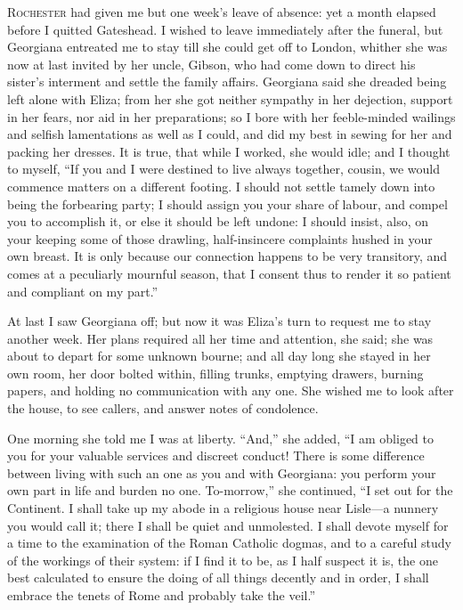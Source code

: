
 \textsc{ Rochester} had given me but one week's leave of absence: yet a month
elapsed before I quitted Gateshead. I wished to leave immediately after
the funeral, but Georgiana entreated me to stay till she could get off
to London, whither she was now at last invited by her uncle, \Mr{} Gibson,
who had come down to direct his sister's interment and settle the family
affairs. Georgiana said she dreaded being left alone with Eliza; from
her she got neither sympathy in her dejection, support in her fears, nor
aid in her preparations; so I bore with her feeble-minded wailings and
selfish lamentations as well as I could, and did my best in sewing for
her and packing her dresses. It is true, that while I worked, she would
idle; and I thought to myself, \enquote{If you and I were destined to
live always together, cousin, we would commence matters on a different
footing. I should not settle tamely down into being the forbearing
party; I should assign you your share of labour, and compel you to
accomplish it, or else it should be left undone: I should insist, also,
on your keeping some of those drawling, half-insincere complaints hushed
in your own breast. It is only because our connection happens to be
very transitory, and comes at a peculiarly mournful season, that I
consent thus to render it so patient and compliant on my part.}

At last I saw Georgiana off; but now it was Eliza's turn to request me
to stay another week. Her plans required all her time and attention,
she said; she was about to depart for some unknown bourne; and all day
long she stayed in her own room, her door bolted within, filling trunks,
emptying drawers, burning papers, and holding no communication with any
one. She wished me to look after the house, to see callers, and answer
notes of condolence.

One morning she told me I was at liberty. \enquote{And,} she added,
\enquote{I am obliged to you for your valuable services and discreet
conduct! There is some difference between living with such an one as
you and with Georgiana: you perform your own part in life and burden no
one. To-morrow,} she continued, \enquote{I set out for the Continent. 
I shall take up my abode in a religious house near Lisle---a nunnery you
would call it; there I shall be quiet and unmolested. I shall devote
myself for a time to the examination of the Roman Catholic dogmas, and
to a careful study of the workings of their system: if I find it to be,
as I half suspect it is, the one best calculated to ensure the doing of
all things decently and in order, I shall embrace the tenets of Rome and
probably take the veil.}

